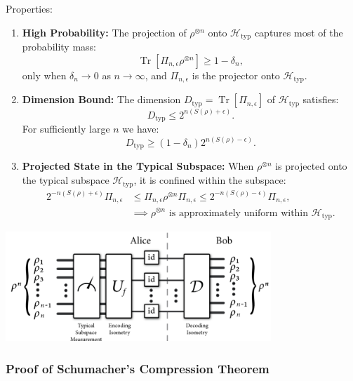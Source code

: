 Properties:

\begin{enumerate}
    \item \textbf{High Probability:} The projection of \(\rho^{\otimes n}\) onto \(\mathcal{H}_{\text{typ}}\) captures most of the probability mass:
    \[
    \operatorname{Tr}[\Pi_{n, \epsilon} \rho^{\otimes n}] \geq 1 - \delta_n,
    \]
    only when \(\delta_n \to 0\) as \(n \to \infty\), and \(\Pi_{n, \epsilon}\) is the projector onto \(\mathcal{H}_{\text{typ}}\).

    \item \textbf{Dimension Bound:} The dimension \(D_{\text{typ}} = \operatorname{Tr}[\Pi_{n, \epsilon}]\) of \(\mathcal{H}_{\text{typ}}\) satisfies:
    \[
    D_{\text{typ}} \leq 2^{n(S(\rho) + \epsilon)}.
    \]
    For sufficiently large \(n\) we have:
    \[
    D_{\text{typ}} \geq (1 - \delta_n) 2^{n(S(\rho) - \epsilon)}.
    \]

\item \textbf{Projected State in the Typical Subspace:} 
When $\rho^{\otimes n}$ is projected onto the typical subspace $\mathcal{H}_{\text{typ}}$, it is confined within the subspace: 
\[
\begin{aligned}
    2^{-n(S(\rho) + \epsilon)} \Pi_{n, \epsilon} &\leq \Pi_{n, \epsilon} \rho^{\otimes n} \Pi_{n, \epsilon} \leq 2^{-n(S(\rho) - \epsilon)} \Pi_{n, \epsilon}, \\
    &\implies \rho^{\otimes n} \text{ is approximately uniform within } \mathcal{H}_{\text{typ}}.
\end{aligned}
\]

\end{enumerate}

\begin{center}
    \includegraphics[width=0.75\textwidth]{figures/schumacher.png}
\end{center}

\subsubsection{Proof of Schumacher's Compression Theorem}

